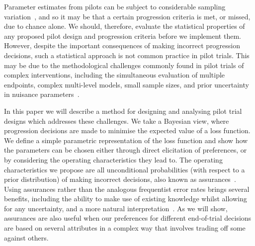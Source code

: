 \documentclass[AMA,STIX1COL]{WileyNJD-v2}
\begin{document}



Parameter estimates from pilots can be subject to considerable sampling variation~\cite{Eldridge2015, Cooper2018}, and so it may be that a certain progression criteria is met, or missed, due to chance alone. We should, therefore, evaluate the statistical properties of any proposed pilot design and progression criteria before we implement them. However, despite the important consequences of making incorrect progression decisions, such a statistical approach is not common practice in pilot trials. This may be due to the methodological challenges commonly found in  pilot trials of complex interventions, including the simultaneous evaluation of multiple endpoints, complex multi-level models, small sample sizes, and prior uncertainty in nuisance parameters~\cite{Wilson2015}.

In this paper we will describe a method for designing and analysing pilot trial designs which addresses these challenges. We take a Bayesian view, where progression decisions are made to minimise the expected value of a loss function. We define a simple parametric representation of the loss function and show how the parameters can be chosen either through direct elicitation of preferences, or by considering the operating characteristics they lead to. The operating characteristics we propose are all unconditional probabilities (with respect to a prior distribution) of making incorrect decisions, also known as assurances~\cite{OHagan2005}. Using assurances rather than the analogous frequentist error rates brings several benefits, including the ability to make use of existing knowledge whilst allowing for any uncertainty, and a more natural interpretation~\cite{Crisp2018}. As we will show, assurances are also useful when our preferences for different end-of-trial decisions are based on several attributes in a complex way that involves trading off some against others.
\end{document}
